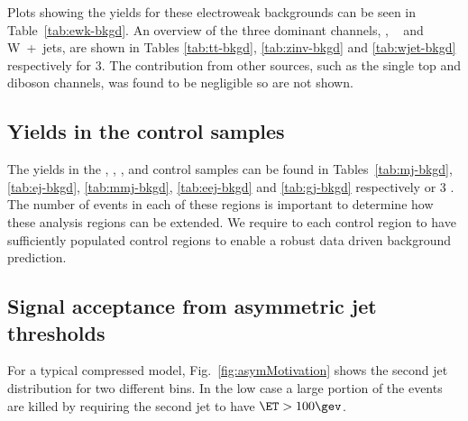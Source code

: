Plots showing the yields for these electroweak backgrounds can be seen in Table~\ref{tab:ewk-bkgd}.
An overview of the three dominant channels, \ttbar, \zInv~ and W~+~jets, are shown in Tables \ref{tab:tt-bkgd}, 
\ref{tab:zinv-bkgd} and \ref{tab:wjet-bkgd} respectively for 3\ifb. The contribution from
other sources, such as the single top and diboson channels, was found to be
negligible so are not shown.


\newpage

\newpage

\newpage

\newpage


\newpage
\subsection{Yields in the control samples}

The yields in the \mj, \mmj, \ej, \eej and \gj control samples can be found in
Tables~\ref{tab:mj-bkgd}, \ref{tab:ej-bkgd}, \ref{tab:mmj-bkgd}, \ref{tab:eej-bkgd}
and \ref{tab:gj-bkgd} respectively or 3 \ifb. 
The number of events in each of these regions is important to determine how these analysis regions can be extended. We require to 
each control region to have sufficiently populated control regions to enable a robust data driven background prediction.



\newpage

\newpage

\newpage

\subsection{Signal acceptance from asymmetric jet \Pt thresholds}

For a typical compressed model, Fig.~\ref{fig:asymMotivation} shows the second jet \PT
distribution for two different \HT bins. In the low \HT case a large portion of
the events are killed by requiring the second jet to have $\ET>100\gev$. 

